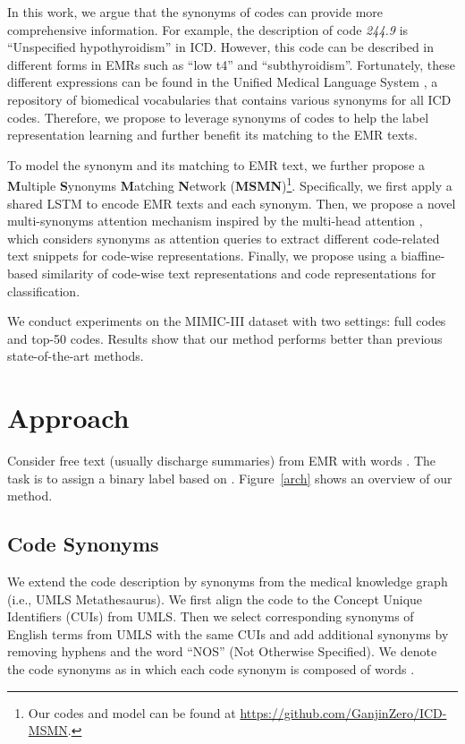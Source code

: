 \documentclass[11pt]{article}
\begin{document}
In this work, we argue that the synonyms of codes can provide more comprehensive information. For example, the description of code \textit{244.9} is ``Unspecified hypothyroidism'' in ICD. 
However, this code can be described in different forms in EMRs such as ``low t4'' and ``subthyroidism''. Fortunately, these different expressions can be found in the Unified Medical Language System \cite{Bodenreider2004}, a repository of biomedical vocabularies that contains various synonyms for all ICD codes. Therefore, we propose to leverage synonyms of codes to help the label representation learning and further benefit its matching to the EMR texts. 





To model the synonym and its matching to EMR text, we further propose a \textbf{M}ultiple \textbf{S}ynonyms \textbf{M}atching \textbf{N}etwork (\textbf{MSMN})\footnote{Our codes and model can be found at \url{https://github.com/GanjinZero/ICD-MSMN}.}.
Specifically, we first apply a shared LSTM to encode EMR texts and each synonym. Then, we propose a novel multi-synonyms attention mechanism inspired by the multi-head attention \cite{vaswani2017attention}, which considers synonyms as attention queries to extract different code-related text snippets for code-wise representations.
Finally, we propose using a biaffine-based similarity of code-wise text representations and code representations for classification.

We conduct experiments on the MIMIC-III dataset with two settings: full codes and top-50 codes. Results show that our method performs better than previous state-of-the-art methods.



\section{Approach}
Consider free text  (usually discharge summaries) from EMR with
words .
The task is to assign a binary label  based on .
Figure~\ref{arch} shows an overview of our method.



\subsection{Code Synonyms}

We extend the code description  by synonyms from the medical knowledge graph (i.e., UMLS Metathesaurus).
We first align the code to the Concept Unique Identifiers (CUIs) from UMLS.
Then we select corresponding synonyms of English terms from UMLS with the same CUIs and add additional synonyms by removing hyphens and the word ``NOS'' (Not Otherwise Specified).
We denote the code synonyms as  in which each code synonym  is composed of words .
\end{document}
